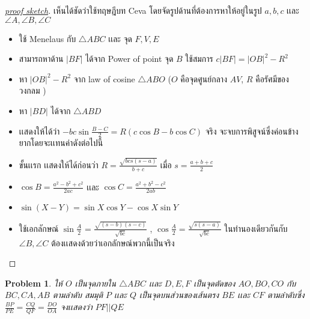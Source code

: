 \documentclass[a4paper,12pt]{article}
\newtheorem{problem}{Problem}[section]
\begin{document}
		\begin{proof}[\underline{proof sketch}]
			เห็นได้ชัดว่าใช้ทฤษฎีบท Ceva โดยจัดรูปด้านที่ต้องการหาให้อยู่ในรูป $a,b,c$ เเละ $\angle{A},\angle{B},\angle{C}$
		\begin{itemize}
			\item ใช้ Menelaus กับ $\bigtriangleup{ABC}$ เเละ จุด $F,V,E$
			\item สามารถหาด้าน $|BF|$ ได้จาก Power of point จุด $B$ ใช้สมการ $c|BF| = |OB|^2 - R^2$
			\item หา $|OB|^2 - R^2$ จาก law of cosine $\bigtriangleup{ABO}$ ($O$ คือจุดศูนย์กลาง $AV$, $R$ คือรัศมีของวงกลม )
			\item หา $|BD|$ ได้จาก $\bigtriangleup{ABD}$
			\item เเสดงให้ได้ว่า $-bc\sin{\frac{B-C}{2} = R(c\cos{B} - b\cos{C})}$  จริง	จะจบการพิสูจน์ซึ่งค่อนข้างยากโดยจะเเทนค่าดังต่อไปนี้
			\item ขั้นเเรก เเสดงให้ได้ก่อนว่า $R = \frac{\sqrt{bcs(s-a)}}{b+c}$ เมื่อ $s = \frac{a+b+c}{2}$
			\item $\cos{B} = \frac{a^2-b^2+c^2}{2ac}$ เเละ $\cos{C} = \frac{a^2+b^2-c^2}{2ab}$
			\item $\sin(X - Y) = \sin{X}\cos{Y} -\cos{X}\sin{Y}$
			\item ใช้เอกลักษณ์ $\sin{\frac{A}{2}}$ = $\frac{\sqrt{(s-b)(s-c)}}{\sqrt{bc}}$ , $\cos{\frac{A}{2}}={\frac{\sqrt{s(s-a)}}{\sqrt{bc}}}$ ในทำนองเดียวกันกับ $\angle{B},\angle{C}$ ต้องเเสดงด้วยว่าเอกลักษณ์พวกนี้เป็นจริง

		\end{itemize}
		\end{proof}
		\newpage
		\begin{problem}
			ให้ $O$ เป็นจุดภายใน $\bigtriangleup{ABC}$ เเละ $D,E,F$ เป็นจุดตัดของ $AO,BO,CO$ กับ $BC,CA,AB$ ตามลำดับ สมมุติ $P$ เเละ $Q$ เป็นจุดบนส่วนของเส้นตรง $BE$ เเละ $CF$ ตามลำดับซึ่ง $\frac{BP}{PE} = \frac{CQ}{QF}= \frac{DO}{OA}$ จงเเสดงว่า $PF||QE$
		\end{problem}
\end{document}
